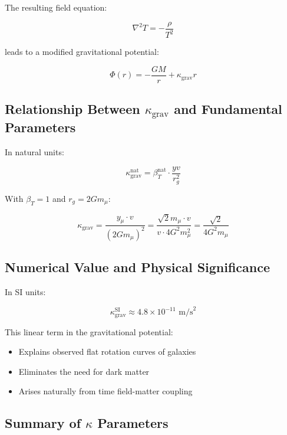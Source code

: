 \documentclass[12pt,a4paper]{article}
\begin{document}
	The resulting field equation:
	
	\begin{equation}
		\nabla^2 T = -\frac{\rho}{T^2}
	\end{equation}
	
	leads to a modified gravitational potential:
	
	\begin{equation}
		\Phi(r) = -\frac{GM}{r} + \kappa_{\text{grav}} r
	\end{equation}
	
	\subsection{Relationship Between $\kappa_{\text{grav}}$ and Fundamental Parameters}
	
	In natural units:
	
	\begin{equation}
		\kappa_{\text{grav}}^{\text{nat}} = \beta_T^{\text{nat}} \cdot \frac{yv}{r_g^2}
	\end{equation}
	
	With $\beta_T = 1$ and $r_g = 2Gm_\mu$:
	
	\begin{equation}
		\kappa_{\text{grav}} = \frac{y_\mu \cdot v}{(2Gm_\mu)^2} = \frac{\sqrt{2} m_\mu \cdot v}{v \cdot 4G^2m_\mu^2} = \frac{\sqrt{2}}{4G^2m_\mu}
	\end{equation}
	
	\subsection{Numerical Value and Physical Significance}
	
	In SI units:
	
	\begin{equation}
		\kappa_{\text{grav}}^{\text{SI}} \approx 4.8 \times 10^{-11} \text{ m/s}^2
	\end{equation}
	
	This linear term in the gravitational potential:
	\begin{itemize}
		\item Explains observed flat rotation curves of galaxies
		\item Eliminates the need for dark matter
		\item Arises naturally from time field-matter coupling
	\end{itemize}
	
	\subsection{Summary of $\kappa$ Parameters}
	
\end{document}

